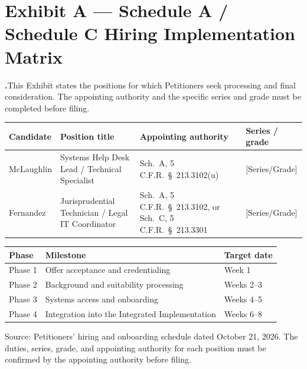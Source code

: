 \documentclass[12pt,letterpaper]{article}
\newcounter{para}
\newcommand{\np}{%
  \par\medskip
  \refstepcounter{para}%
  \noindent\hangindent=0.45in\hangafter=1
  \textbf{\arabic{para}.}\hspace{0.15in}\ignorespaces}
\newcommand{\R}{\S}
\begin{document}
\newpage
\section*{Exhibit A --- Schedule A / Schedule C Hiring Implementation Matrix}

\np This Exhibit states the positions for which Petitioners seek processing and
final consideration. The appointing authority and the specific series and grade
must be completed before filing.

\vspace{0.15in}
\noindent
\begin{longtable}{@{}p{1.1in}p{1.5in}p{1.75in}p{1.3in}@{}}
\toprule
Candidate & Position title & Appointing authority & Series / grade\\
\midrule
\endhead
McLaughlin & Systems Help Desk Lead / Technical Specialist & Sch.\ A, 5 C.F.R.\
\R\ 213.3102(u) & [Series/Grade]\\
Fernandez & Jurisprudential Technician / Legal IT Coordinator & Sch.\ A, 5
C.F.R.\ \R\ 213.3102, or Sch.\ C, 5 C.F.R.\ \R\ 213.3301 & [Series/Grade]\\
\bottomrule
\end{longtable}

\vspace{0.2in}
\noindent
\begin{longtable}{@{}p{1.5in}p{2.6in}p{1.5in}@{}}
\toprule
Phase & Milestone & Target date\\
\midrule
\endhead
Phase 1 & Offer acceptance and credentialing & Week 1\\
Phase 2 & Background and suitability processing & Weeks 2--3\\
Phase 3 & Systems access and onboarding & Weeks 4--5\\
Phase 4 & Integration into the Integrated Implementation & Weeks 6--8\\
\bottomrule
\end{longtable}

\vspace{0.15in}
\noindent\footnotesize Source: Petitioners' hiring and onboarding schedule
dated October 21, 2026. The duties, series, grade, and appointing authority for
each position must be confirmed by the appointing authority before filing.

\newpage
\end{document}
